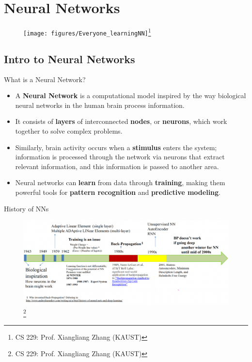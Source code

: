 \documentclass[10pt, hyperref={colorlinks = true,linkcolor = blue}]{beamer}
\begin{document}
{
\section[Neural Networks]{Neural Networks}

\begin{frame}
\begin{figure}
\texttt{[image: figures/Everyone\_learningNN]}\footnote{CS 229: Prof. Xiangliang Zhang (KAUST)}
\end{figure}
\end{frame}

{
\subsection{Intro to Neural Networks}

\begin{frame}{What is a Neural Network?}
\begin{itemize}
    \item A \textbf{Neural Network} is a computational model inspired by the way biological neural networks in the human brain process information.
    \item It consists of \textbf{layers} of interconnected \textbf{nodes}, or \textbf{neurons}, which work together to solve complex problems.
     \item Similarly, brain activity occurs when a \textbf{stimulus} enters the system; information is processed through the network via neurons that extract relevant information, and this information is passed to another area.
    \item Neural networks can \textbf{learn} from data through \textbf{training}, making them powerful tools for \textbf{pattern recognition} and \textbf{predictive modeling}.
\end{itemize}
\end{frame}

\begin{frame}{History of NNs}
\begin{figure}
\includegraphics[width=1\linewidth]{figures/NN-history.pdf}\footnote{CS 229: Prof. Xiangliang Zhang (KAUST)}
\end{figure}
\end{frame}

}}
\end{document}
